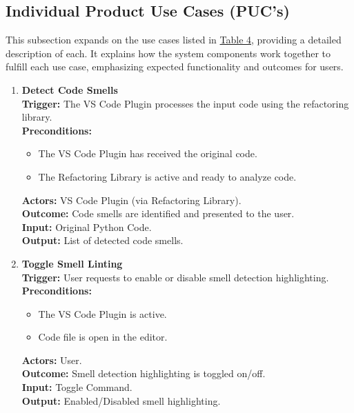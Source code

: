 \documentclass[12pt]{article}
\begin{document}
\subsection{Individual Product Use Cases (PUC's)}
This subsection expands on the use cases listed in
\hyperref[tab:puc]{Table 4}, providing a detailed description of
each. It explains how the system components work together to fulfill
each use case, emphasizing expected functionality and outcomes for users.

\setlength{\parindent}{0pt}
\begin{enumerate}[label={\bf PUC \arabic*:}, wide=0pt, font=\itshape]

  \item \textbf{Detect Code Smells} \\[2mm]
    \textbf{Trigger:} The VS Code Plugin processes the input code using the refactoring library. \\[2mm]
    \textbf{Preconditions:}
    \begin{itemize}
      \item The VS Code Plugin has received the original code.
      \item The Refactoring Library is active and ready to analyze code.
    \end{itemize}
    \textbf{Actors:} VS Code Plugin (via Refactoring Library). \\
    \textbf{Outcome:} Code smells are identified and presented to the user. \\
    \textbf{Input:} Original Python Code. \\
    \textbf{Output:} List of detected code smells.

  \item \textbf{Toggle Smell Linting} \\[2mm]
    \textbf{Trigger:} User requests to enable or disable smell detection highlighting. \\[2mm]
    \textbf{Preconditions:}
    \begin{itemize}
      \item The VS Code Plugin is active.
      \item Code file is open in the editor.
    \end{itemize}
    \textbf{Actors:} User. \\
    \textbf{Outcome:} Smell detection highlighting is toggled on/off. \\
    \textbf{Input:} Toggle Command. \\
    \textbf{Output:} Enabled/Disabled smell highlighting.


\end{enumerate}
\end{document}
